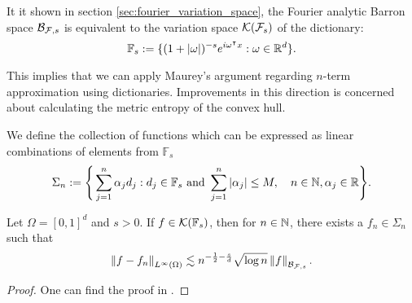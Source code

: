 It it shown in section \ref{sec:fourier_variation_space}, the Fourier analytic
Barron space $\mathcal{B}_{\mathcal{F},s}$ is equivalent to the variation space
$\mathcal{K}({\mathcal{F}_s})$ of the dictionary:
\begin{equation}
    \mathbb{F}_{s} := \{
        (1 + \left| \omega \right|)^{-s} e^{i\omega{}^{\intercal} x}: \omega \in \mathbb{R}^d
    \}.
\end{equation}

This implies that we can apply Maurey's argument regarding $n$-term
approximation using dictionaries. Improvements in this direction
\cite{siegelCharacterizationVariationSpaces2022,
siegelHighOrderApproximationRates2021,
siegelSharpBoundsApproximation2022,klusowskiRiskBoundsHighdimensional2018a} is
concerned about calculating the metric entropy of the convex hull. 

We define the collection of functions which can be expressed as linear
combinations of elements from $\mathbb{F}_s$
\begin{equation}
    \Sigma_n := \Bigg\{
        \sum_{j=1}^n \alpha_j d_j: 
        d_j \in \mathbb{F}_s \textnormal{ and } 
        \sum_{j=1}^n \left| \alpha_j \right| \leq M, \quad 
        n \in \mathbb{N}, \alpha_j \in \mathbb{R}
    \Bigg\}.
\end{equation}

\begin{theorem}
    Let $\Omega = [0,1]^d$ and $s > 0$. If $f \in \mathcal{K}(\mathbb{F}_s)$, then
    for $n \in \mathbb{N}$, there exists a $f_n \in \Sigma_n$ such that
    \begin{equation}
        \left\| f-f_n \right\|_{L^{\infty}(\Omega)} \lesssim 
        n^{-\frac{1}{2}-\frac{s}{d}} \sqrt{\log{n}} \left\| f \right\|_{\mathcal{B}_{\mathcal{F},s}}.
    \end{equation}

\end{theorem}

\begin{proof}
    One can find the proof in
    \cite{klusowskiApproximationCombinationsReLU2018,siegelSharpBoundsApproximation2022}.
\end{proof}


